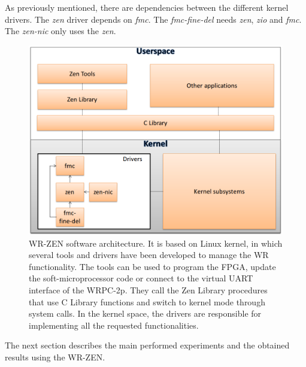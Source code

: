 As previously mentioned, there are dependencies between the different kernel
drivers. The \textit{zen} driver depends
on \textit{fmc}. The \textit{fmc-fine-del} needs \textit{zen}, \textit{zio} and
\textit{fmc}. The \textit{zen-nic} only uses the \textit{zen}.

\begin{figure}[H] \centering
	\includegraphics[scale=0.4]{img/software_architecture}
	\caption{WR-ZEN software
	architecture. It is based on Linux kernel, in which
	several tools and drivers have been developed to manage the WR functionality. The
	tools can be used to program the FPGA, update the soft-microprocessor
	code or connect to the virtual UART interface of the WRPC-2p. They call
	the Zen Library procedures that use C Library functions and
	switch to kernel mode through system calls. In the kernel space, the
	drivers are responsible for implementing all the requested functionalities. }
	\label{fig:software_architecture} 
\end{figure}

The next section describes the main performed experiments and the obtained
results using the WR-ZEN.

